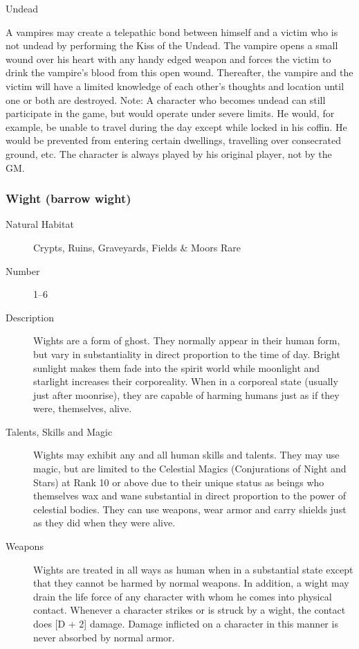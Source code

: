 \begin{mmgroup}{Undead}
\begin{mmcomment}
A vampires may create a telepathic bond between himself and a victim
who is not undead by performing the Kiss of the Undead.  The vampire
opens a small wound over his heart with any handy edged weapon and
forces the victim to drink the vampire's blood from this open
wound. Thereafter, the vampire and the victim will have a limited
knowledge of each other's thoughts and location until one or both are
destroyed.  Note: A character who becomes undead can still participate
in the game, but would operate under severe limits. He would, for
example, be unable to travel during the day except while locked in his
coffin. He would be prevented from entering certain dwellings,
travelling over consecrated ground, etc. The character is always
played by his original player, not by the GM.
\end{mmcomment}

\subsubsection{Wight (barrow wight)}

\begin{description}
\item[Natural Habitat]  Crypts, Ruins, Graveyards, Fields \& Moors Rare

\item[Number] 1–6

\item[Description] Wights are a form of ghost. They normally appear in
their human form, but vary in substantiality in direct proportion to
the time of day. Bright sunlight makes them fade into the spirit world
while moonlight and starlight increases their corporeality. When in a
corporeal state (usually just after moonrise), they are capable of
harming humans just as if they were, themselves, alive.

\item[Talents, Skills and Magic] Wights may exhibit any and all human skills and talents.
They may use magic, but are limited to the Celestial Magics
(Conjurations of Night and Stars) at Rank 10 or above due to their
unique status as beings who themselves wax and wane substantial in
direct proportion to the power of celestial bodies. They can use
weapons, wear armor and carry shields just as they did when they were
alive.

\item[Weapons] Wights are treated in all ways as human when in a
substantial state except that they cannot be harmed by normal
weapons. In addition, a wight may drain the life force of any
character with whom he comes into physical contact. Whenever a
character strikes or is struck by a wight, the contact does [D + 2]
damage. Damage inflicted on a character in this manner is never
absorbed by normal armor.


\end{description}
\end{mmgroup}
